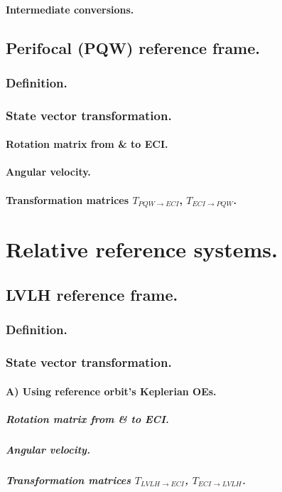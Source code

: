 		\paragraph{Intermediate conversions. \\}
	\subsection{Perifocal (PQW) reference frame.}
		\subsubsection{Definition.}
		\subsubsection{State vector transformation.}
			\paragraph{Rotation matrix from \& to ECI. \\}
			\paragraph{Angular velocity. \\}
			\paragraph{Transformation matrices $T_{PQW\rightarrow ECI}$, $T_{ECI\rightarrow PQW}$. \\}
		
\section{Relative reference systems.}
%
	
	\subsection{LVLH reference frame.}
		\subsubsection{Definition.}
		\subsubsection{State vector transformation.}
		\paragraph{A) Using reference orbit's Keplerian OEs. \\}
			\subparagraph{Rotation matrix from \& to ECI. \\}
			\subparagraph{Angular velocity. \\}
			\subparagraph{Transformation matrices $T_{LVLH\rightarrow ECI}$, $T_{ECI\rightarrow LVLH}$. \\}
